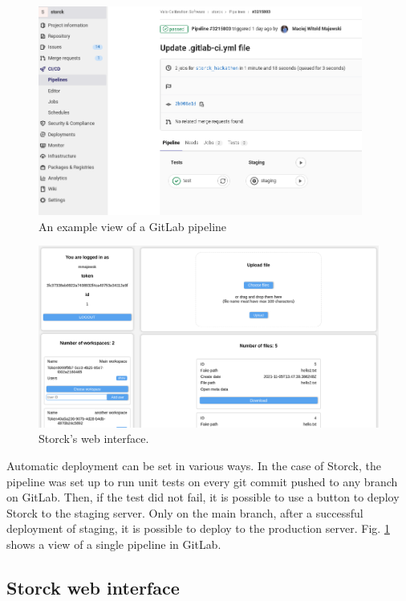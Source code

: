 \begin{figure}[H]
\centering
\includegraphics[width=0.95\textwidth]{figures/chapter5/storck/storck_gitlab.png}
\caption{An example view of a GitLab pipeline}
\label{fig:storck-gitlab}
\end{figure}

\begin{figure}[H]
\centering
\includegraphics[width=\textwidth]{figures/chapter5/storck/screenshot_web.png}
\caption{Storck's web interface.}
\label{fig:storck-web-interface}
\end{figure}

Automatic deployment can be set in various ways.
In the case of Storck, the pipeline was set up to run unit tests on every git commit pushed to any branch on GitLab.
Then, if the test did not fail, it is possible to use a button to deploy Storck to the staging server.
Only on the main branch, after a successful deployment of staging, it is possible to deploy to the production server.
Fig. \ref{fig:storck-gitlab} shows a view of a single pipeline in GitLab.

\subsection{Storck web interface}



